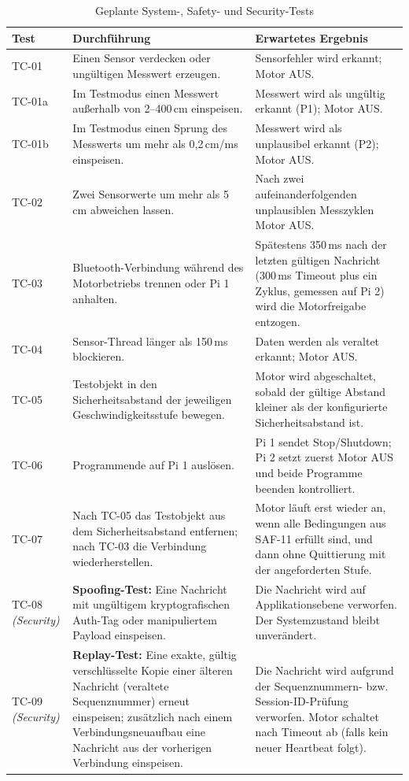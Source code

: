 \begin{table}[H]
    \centering
    \small
    \begin{tabularx}{\textwidth}{@{}p{1.5cm}YY@{}}
        \toprule
        \textbf{Test} & \textbf{Durchführung} & \textbf{Erwartetes Ergebnis} \\
        \midrule
        TC-01 & Einen Sensor verdecken oder ungültigen Messwert erzeugen. & Sensorfehler wird erkannt; Motor AUS. \\
        TC-01a & Im Testmodus einen Messwert außerhalb von 2--400\,cm einspeisen. & Messwert wird als ungültig erkannt (P1); Motor AUS. \\
        TC-01b & Im Testmodus einen Sprung des Messwerts um mehr als 0{,}2\,cm/ms einspeisen. & Messwert wird als unplausibel erkannt (P2); Motor AUS. \\
        TC-02 & Zwei Sensorwerte um mehr als 5\,cm abweichen lassen. & Nach zwei aufeinanderfolgenden unplausiblen Messzyklen Motor AUS. \\
        TC-03 & Bluetooth-Verbindung während des Motorbetriebs trennen oder Pi 1 anhalten. & Spätestens 350\,ms nach der letzten gültigen Nachricht (300\,ms Timeout plus ein Zyklus, gemessen auf Pi 2) wird die Motorfreigabe entzogen. \\
        TC-04 & Sensor-Thread länger als 150\,ms blockieren. & Daten werden als veraltet erkannt; Motor AUS. \\
        TC-05 & Testobjekt in den Sicherheitsabstand der jeweiligen Geschwindigkeitsstufe bewegen. & Motor wird abgeschaltet, sobald der gültige Abstand kleiner als der konfigurierte Sicherheitsabstand ist. \\
        TC-06 & Programmende auf Pi 1 auslösen. & Pi 1 sendet Stop/Shutdown; Pi 2 setzt zuerst Motor AUS und beide Programme beenden kontrolliert. \\
        TC-07 & Nach TC-05 das Testobjekt aus dem Sicherheitsabstand entfernen; nach TC-03 die Verbindung wiederherstellen. & Motor läuft erst wieder an, wenn alle Bedingungen aus SAF-11 erfüllt sind, und dann ohne Quittierung mit der angeforderten Stufe. \\
        \midrule
        TC-08 \newline \textit{(Security)} & \textbf{Spoofing-Test:} Eine Nachricht mit ungültigem kryptografischen Auth-Tag oder manipuliertem Payload einspeisen. & Die Nachricht wird auf Applikationsebene verworfen. Der Systemzustand bleibt unverändert. \\
        TC-09 \newline \textit{(Security)} & \textbf{Replay-Test:} Eine exakte, gültig verschlüsselte Kopie einer älteren Nachricht (veraltete Sequenznummer) erneut einspeisen; zusätzlich nach einem Verbindungsneuaufbau eine Nachricht aus der vorherigen Verbindung einspeisen. & Die Nachricht wird aufgrund der Sequenznummern- bzw. Session-ID-Prüfung verworfen. Motor schaltet nach Timeout ab (falls kein neuer Heartbeat folgt). \\
        \bottomrule
    \end{tabularx}
    \caption{Geplante System-, Safety- und Security-Tests}
\end{table}
